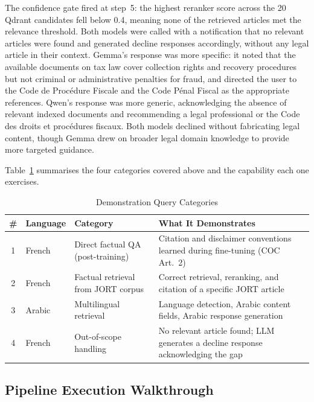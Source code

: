 The confidence gate fired at step~5: the highest reranker score across the 20 Qdrant candidates fell below 0.4, meaning none of the retrieved articles met the relevance threshold. Both models were called with a notification that no relevant articles were found and generated decline responses accordingly, without any legal article in their context. Gemma's response was more specific: it noted that the available documents on tax law cover collection rights and recovery procedures but not criminal or administrative penalties for fraud, and directed the user to the Code de Procédure Fiscale and the Code Pénal Fiscal as the appropriate references. Qwen's response was more generic, acknowledging the absence of relevant indexed documents and recommending a legal professional or the Code des droits et procédures fiscaux. Both models declined without fabricating legal content, though Gemma drew on broader legal domain knowledge to provide more targeted guidance.

\vspace{1em}

Table~\ref{tab:query-categories} summarises the four categories covered above and the capability each one exercises.

\begin{table}[H]
\centering
\caption{Demonstration Query Categories}
\label{tab:query-categories}
\renewcommand{\arraystretch}{1.3}
\begin{tabular}{|c|p{2cm}|p{3.5cm}|p{5.5cm}|}
\hline
\textbf{\#} & \textbf{Language} & \textbf{Category} & \textbf{What It Demonstrates} \\
\hline
1 & French & Direct factual QA (post-training) & Citation and disclaimer conventions learned during fine-tuning (COC Art.~2) \\
\hline
2 & French & Factual retrieval from \ac{JORT} corpus & Correct retrieval, reranking, and citation of a specific \ac{JORT} article \\
\hline
3 & Arabic & Multilingual retrieval & Language detection, Arabic content fields, Arabic response generation \\
\hline
4 & French & Out-of-scope handling & No relevant article found; LLM generates a decline response acknowledging the gap \\
\hline
\end{tabular}
\end{table}

\subsection{Pipeline Execution Walkthrough}
\label{subsec:ch4-pipeline-execution}

